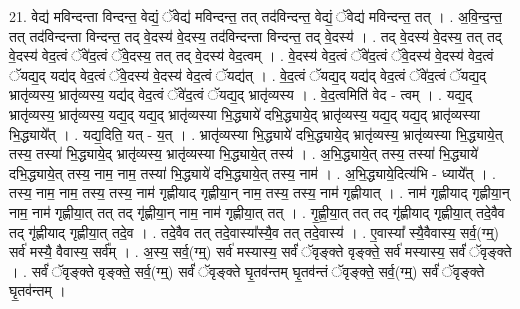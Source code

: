 \documentclass[17pt]{extarticle}
\begin{document}
21. वेद्य॑ मविन्दन्ता विन्दन्त॒ वेद्यं॒ ॅवेद्य॑ मविन्दन्त॒ तत् तद॑विन्दन्त॒ वेद्यं॒ ॅवेद्य॑ मविन्दन्त॒ तत् । . अ॒वि॒न्द॒न्त॒ तत् तद॑विन्दन्ता विन्दन्त॒ तद् वे॒दस्य॑ वे॒दस्य॒ तद॑विन्दन्ता विन्दन्त॒ तद् वे॒दस्य॑ । . तद् वे॒दस्य॑ वे॒दस्य॒ तत् तद् वे॒दस्य॑ वेद॒त्वं ॅवे॑द॒त्वं ॅवे॒दस्य॒ तत् तद् वे॒दस्य॑ वेद॒त्वम् । . वे॒दस्य॑ वेद॒त्वं ॅवे॑द॒त्वं ॅवे॒दस्य॑ वे॒दस्य॑ वेद॒त्वं ॅयद्य॒द् यद्य॑द् वेद॒त्वं ॅवे॒दस्य॑ वे॒दस्य॑ वेद॒त्वं ॅयद्य॑त् । . वे॒द॒त्वं ॅयद्य॒द् यद्य॑द् वेद॒त्वं ॅवे॑द॒त्वं ॅयद्य॒द् भ्रातृ॑व्यस्य॒ भ्रातृ॑व्यस्य॒ यद्य॑द् वेद॒त्वं ॅवे॑द॒त्वं ॅयद्य॒द् भ्रातृ॑व्यस्य । . वे॒द॒त्वमिति॑ वेद - त्वम् । . यद्य॒द् भ्रातृ॑व्यस्य॒ भ्रातृ॑व्यस्य॒ यद्य॒द् यद्य॒द् भ्रातृ॑व्यस्या भि॒द्ध्याये॑ दभि॒द्ध्याये॒द् भ्रातृ॑व्यस्य॒ यद्य॒द् यद्य॒द् भ्रातृ॑व्यस्या भि॒द्ध्याये᳚त् । . यद्य॒दिति॒ यत् - य॒त् । . भ्रातृ॑व्यस्या भि॒द्ध्याये॑ दभि॒द्ध्याये॒द् भ्रातृ॑व्यस्य॒ भ्रातृ॑व्यस्या भि॒द्ध्याये॒त् तस्य॒ तस्या॑ भि॒द्ध्याये॒द् भ्रातृ॑व्यस्य॒ भ्रातृ॑व्यस्या भि॒द्ध्याये॒त् तस्य॑ । . अ॒भि॒द्ध्याये॒त् तस्य॒ तस्या॑ भि॒द्ध्याये॑ दभि॒द्ध्याये॒त् तस्य॒ नाम॒ नाम॒ तस्या॑ भि॒द्ध्याये॑ दभि॒द्ध्याये॒त् तस्य॒ नाम॑ । . अ॒भि॒द्ध्याये॒दित्य॑भि - ध्याये᳚त् । . तस्य॒ नाम॒ नाम॒ तस्य॒ तस्य॒ नाम॑ गृह्णीयाद् गृह्णीया॒न् नाम॒ तस्य॒ तस्य॒ नाम॑ गृह्णीयात् । . नाम॑ गृह्णीयाद् गृह्णीया॒न् नाम॒ नाम॑ गृह्णीया॒त् तत् तद् गृ॑ह्णीया॒न् नाम॒ नाम॑ गृह्णीया॒त् तत् । . गृ॒ह्णी॒या॒त् तत् तद् गृ॑ह्णीयाद् गृह्णीया॒त् तदे॒वैव तद् गृ॑ह्णीयाद् गृह्णीया॒त् तदे॒व । . तदे॒वैव तत् तदे॒वास्या᳚स्यै॒व तत् तदे॒वास्य॑ । . ए॒वास्या᳚ स्यै॒वैवास्य॒ सर्व॒(ग्म्॒) सर्व॑ मस्यै॒ वैवास्य॒ सर्व᳚म् । . अ॒स्य॒ सर्व॒(ग्म्॒) सर्व॑ मस्यास्य॒ सर्वं॑ ॅवृङ्क्ते वृङ्क्ते॒ सर्व॑ मस्यास्य॒ सर्वं॑ ॅवृङ्क्ते । . सर्वं॑ ॅवृङ्क्ते वृङ्क्ते॒ सर्व॒(ग्म्॒) सर्वं॑ ॅवृङ्क्ते घृ॒तव॑न्तम् घृ॒तव॑न्तं ॅवृङ्क्ते॒ सर्व॒(ग्म्॒) सर्वं॑ ॅवृङ्क्ते घृ॒तव॑न्तम् । \newline
\end{document}
